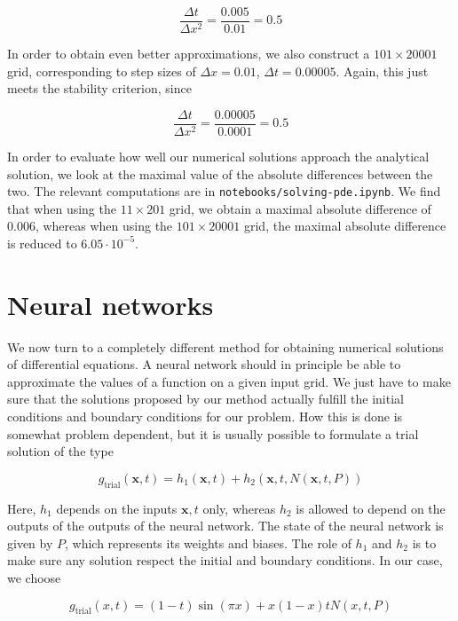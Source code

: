 \documentclass{article}
\begin{document}
\begin{equation}
    \frac{\Delta t}{\Delta x^2} = \frac{0.005}{0.01}=0.5
\end{equation}

In order to obtain even better approximations, we also construct a $101 \times 20001$ grid, corresponding to step sizes of $\Delta x = 0.01$, $\Delta t = 0.00005$. Again, this just meets the stability criterion, since

\begin{equation}
    \frac{\Delta t}{\Delta x^2} = \frac{0.00005}{0.0001}=0.5
\end{equation}

In order to evaluate how well our numerical solutions approach the analytical solution, we look at the maximal value of the absolute differences between the two. The relevant computations are in \texttt{notebooks/solving-pde.ipynb}. We find that when using the $11 \times 201$ grid, we obtain a maximal absolute difference of 0.006, whereas when using the $101 \times 20001$ grid, the maximal absolute difference is reduced to $6.05 \cdot 10^{-5}$.

\section{Neural networks}
We now turn to a completely different method for obtaining numerical solutions of differential equations. A neural network should in principle be able to approximate the values of a function on a given input grid. We just have to make sure that the solutions proposed by our method actually fulfill the initial conditions and boundary conditions for our problem. How this is done is somewhat problem dependent, but it is usually possible to formulate a trial solution of the type

\begin{equation}
    g_{\textrm{trial}}(\mathbf{x}, t) = h_1(\mathbf{x}, t) + h_2(\mathbf{x}, t, N(\mathbf{x}, t, P))
\end{equation}

Here, $h_1$ depends on the inputs $\mathbf{x}, t$ only, whereas $h_2$ is allowed to depend on the outputs of the outputs of the neural network. The state of the neural network is given by $P$, which represents its weights and biases. The role of $h_1$ and $h_2$ is to make sure any solution respect the initial and boundary conditions. In our case, we choose

\begin{equation}
    g_{\textrm{trial}}(x, t) = (1 - t)\sin(\pi x) + x(1 - x) t N(x, t, P)
\end{equation}
\end{document}
